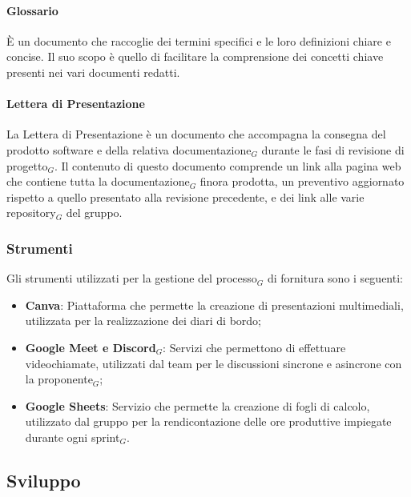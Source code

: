 \documentclass[10pt]{article}
\begin{document}
\begin{justify}
        \paragraph{Glossario}
        È un documento che raccoglie dei termini specifici e le loro definizioni chiare e concise. Il suo scopo è quello di facilitare la comprensione dei concetti chiave presenti nei vari documenti redatti.\\

        \paragraph{Lettera di Presentazione}
        La Lettera di Presentazione è un documento che accompagna la consegna del prodotto software e della relativa documentazione$_G$ durante le fasi di revisione di progetto$_G$. Il contenuto di questo documento comprende un link alla pagina web che contiene tutta la documentazione$_G$ finora prodotta, un preventivo aggiornato rispetto a quello presentato alla revisione precedente, e dei link alle varie repository$_G$ del gruppo.\\

    \subsubsection{Strumenti}
    Gli strumenti utilizzati per la gestione del processo$_G$ di fornitura sono i seguenti:
    \begin{itemize}
        \item \textbf{Canva}: Piattaforma che permette la creazione di presentazioni multimediali, utilizzata per la realizzazione dei diari di bordo;
        \item \textbf{Google Meet e Discord$_G$}: Servizi che permettono di effettuare videochiamate, utilizzati dal team per le discussioni sincrone e asincrone con la proponente$_G$;
        \item \textbf{Google Sheets}: Servizio che permette la creazione di fogli di calcolo, utilizzato dal gruppo per la rendicontazione delle ore produttive impiegate durante ogni sprint$_G$.
    \end{itemize}

    \subsection{Sviluppo}


\end{justify}
\end{document}
